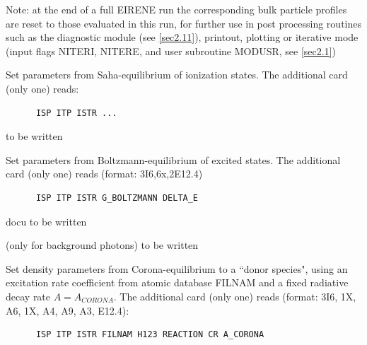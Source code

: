 \begin{description}
\begin{description}
                Note: at the end of a full EIRENE run the corresponding bulk particle profiles
                are reset to those evaluated in this run, for further use in post processing
                routines such as the diagnostic module (see \cref{sec2.11}), printout, plotting
                or iterative mode (input flags NITERI, NITERE, and user subroutine MODUSR, see
                \cref{sec2.1})

          \item[= 'Saha'] Set parameters from Saha-equilibrium of ionization states.
                The additional card (only one) reads:

                \begin{lstlisting}
      ISP ITP ISTR ...
\end{lstlisting}

                to be written
          \item[= 'Boltzmann']
                Set parameters
                from Boltzmann-equilibrium of excited states.
                The additional card (only one) reads (format: 3I6,6x,2E12.4)

                \begin{lstlisting}
      ISP ITP ISTR G_BOLTZMANN DELTA_E
\end{lstlisting}

                docu to be written
          \item[= 'Planck'] (only for background photons) to be
                written
          \item[= 'Corona'] Set density parameters from Corona-equilibrium to a
                ``donor species", using an excitation rate coefficient from atomic database
                FILNAM and a fixed radiative decay rate $A=A_{CORONA}$.
                The additional card (only one) reads (format: 3I6, 1X, A6, 1X, A4, A9, A3,
                E12.4):

                \begin{lstlisting}
      ISP ITP ISTR FILNAM H123 REACTION CR A_CORONA
\end{lstlisting}


\end{description}
\end{description}
